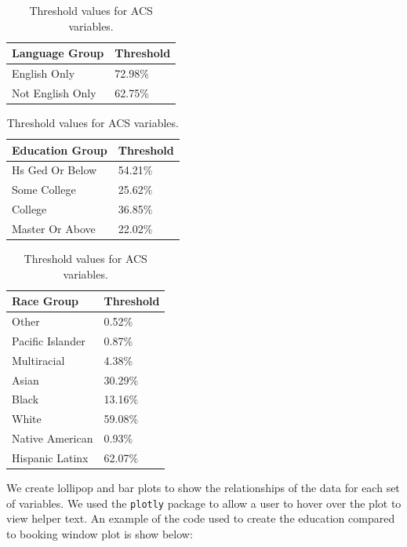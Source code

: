 \documentclass[
  11 pt,
  openany]{book}
\begin{document}
\begin{table}
\caption{\label{tab:unnamed-chunk-32}Threshold values for ACS variables.}

\centering
\begin{tabular}[t]{l|l}
\hline
Language Group & Threshold\\
\hline
English Only & 72.98\%\\
\hline
Not English Only & 62.75\%\\
\hline
\end{tabular}
\centering
\begin{tabular}[t]{l|l}
\hline
Education Group & Threshold\\
\hline
Hs Ged Or Below & 54.21\%\\
\hline
Some College & 25.62\%\\
\hline
College & 36.85\%\\
\hline
Master Or Above & 22.02\%\\
\hline
\end{tabular}
\centering
\begin{tabular}[t]{l|l}
\hline
Race Group & Threshold\\
\hline
Other & 0.52\%\\
\hline
Pacific Islander & 0.87\%\\
\hline
Multiracial & 4.38\%\\
\hline
Asian & 30.29\%\\
\hline
Black & 13.16\%\\
\hline
White & 59.08\%\\
\hline
Native American & 0.93\%\\
\hline
Hispanic Latinx & 62.07\%\\
\hline
\end{tabular}
\end{table}

We create lollipop and bar plots to show the relationships of the data for each set of variables. We used the \texttt{plotly} package \citep{R-plotly} to allow a user to hover over the plot to view helper text. An example of the code used to create the education compared to booking window plot is show below:
\end{document}
